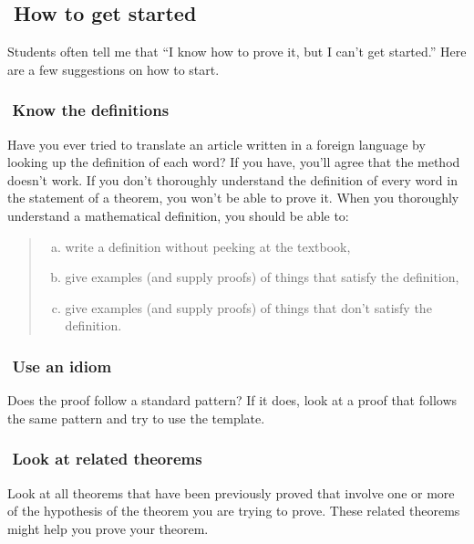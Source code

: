\documentclass[12pt,fleqn]{article}
\newenvironment{alphalist}{
  \begin{enumerate}[(a)]
    \addtolength{\itemsep}{-1.0\itemsep}}
  {\end{enumerate}}
\newcounter{ex}\setcounter{ex}{0}
\newcounter{id}\setcounter{id}{0}
\newcommand{\id}{%
\hspace{-0.2in} \setcounter{id}{\value{id}+1}
\theid \,\,}
\newcounter{se}\setcounter{se}{0}
\newcommand{\se}{%
\hspace{-0.2in} \setcounter{se}{\value{se}+1}
\these \,\,}
\begin{document}
\setcounter{id}{0}

\subsection* {\se How to get started}

Students often tell me that ``I know how to prove it, but I can't get
started.''  Here are a few suggestions on how to start.


\subsubsection*{\id Know the definitions}

Have you ever tried to translate an article written in a foreign
language by looking up the definition of each word?  If you have,
you'll agree that the method doesn't work.  If you don't thoroughly
understand the definition of every word in the statement of a theorem,
you won't be able to prove it.  When you thoroughly understand a
mathematical definition, you should be able to:


\begin{quote}
\begin{alphalist}

\item write a definition without peeking at the textbook,

\item give examples (and supply proofs) of things that satisfy the definition, 

\item give examples (and supply proofs) of things  that don't satisfy the definition.

\end{alphalist}
\end{quote}

\subsubsection*{\id Use an idiom }

Does the proof follow a standard pattern?  If it does, look at a proof that
follows the same pattern and try to use the template.


\subsubsection*{\id Look at related theorems}

Look at all theorems that have been previously proved that involve one or
more of the hypothesis of the theorem you are trying to prove.  These
related theorems might help you prove your theorem.
\end{document}
